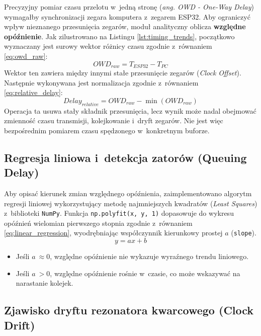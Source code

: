 Precyzyjny pomiar czasu przelotu w~jedną stronę (\textit{ang. OWD - One-Way Delay}) wymagałby synchronizacji zegara komputera z~zegarem ESP32.
Aby ograniczyć wpływ nieznanego przesunięcia zegarów, moduł analityczny oblicza \textbf{względne opóźnienie}.
Jak zilustrowano na Listingu \ref{lst:timing_trends}, początkowo wyznaczany jest surowy wektor różnicy czasu zgodnie z~równaniem \ref{eq:owd_raw}:
\begin{equation}
    OWD_{raw} = T_{ESP32} - T_{PC} \label{eq:owd_raw} \end{equation} Wektor ten zawiera między innymi stałe przesunięcie zegarów (\textit{Clock Offset}).
Następnie wykonywana jest normalizacja zgodnie z~równaniem \ref{eq:relative_delay}:
\begin{equation}
    Delay_{relative} = OWD_{raw} - \min(OWD_{raw}) \label{eq:relative_delay} \end{equation} Operacja ta usuwa stały składnik przesunięcia, lecz wynik może nadal obejmować zmienność czasu transmisji, kolejkowanie i~dryft zegarów.
Nie jest więc bezpośrednim pomiarem czasu spędzonego w~konkretnym buforze.

\subsection{Regresja liniowa i~detekcja zatorów (Queuing Delay)}

Aby opisać kierunek zmian względnego opóźnienia, zaimplementowano algorytm regresji liniowej wykorzystujący metodę najmniejszych kwadratów (\textit{Least Squares}) z~biblioteki \texttt{NumPy}.
Funkcja \texttt{np.polyfit(x, y, 1)} dopasowuje do wykresu opóźnień wielomian pierwszego stopnia zgodnie z~równaniem \ref{eq:linear_regression}, wyodrębniając współczynnik kierunkowy prostej $a$ (\texttt{slope}).
\begin{equation}
    y = ax + b
    \label{eq:linear_regression}
\end{equation}
\begin{itemize}
    \item Jeśli $a~\approx 0$, względne opóźnienie nie wykazuje wyraźnego trendu liniowego.
    \item Jeśli $a~> 0$, względne opóźnienie rośnie w~czasie, co może wskazywać na narastanie kolejek.
\end{itemize}

\subsection{Zjawisko dryftu rezonatora kwarcowego (Clock Drift)}

